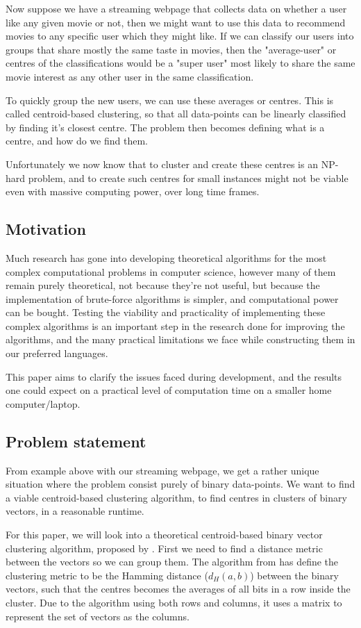 \documentclass[a4paper]{article}
\begin{document}
Now suppose we have a streaming webpage that collects data on whether a user like any given movie or not,
then we might want to use this data to recommend movies to any specific user which they might like.
If we can classify our users into groups that share mostly the same taste in movies, then
the "average-user" or centres of the classifications would be a "super user" most likely to share the same movie
interest as any other user in the same classification.

To quickly group the new users, we can use these averages or centres. This is called centroid-based
clustering, so that all data-points can be linearly classified by finding it's closest centre.
The problem then becomes defining what is a centre, and how do we find them.

Unfortunately we now know that to cluster and create these centres is an NP-hard problem, 
and to create such centres for small instances might not be viable even with massive computing power,
over long time frames.

\subsection{Motivation}
Much research has gone into developing theoretical algorithms for the most complex computational
problems in computer science, however many of them remain purely theoretical, not because
they're not useful, but because the implementation of brute-force algorithms is simpler, and
computational power can be bought. Testing the viability and practicality of implementing
these complex algorithms is an important step in the research done for improving the
algorithms, and the many practical limitations we face while constructing them in our
preferred languages.

This paper aims to clarify the issues faced during development, and the results one could expect
on a practical level of computation time on a smaller home computer/laptop.

\subsection{Problem statement}
From example above with our streaming webpage, we get a rather unique situation where the problem consist 
purely of binary data-points. We want to find a viable centroid-based clustering algorithm, to find
centres in clusters of binary vectors, in a reasonable runtime.

For this paper, we will look into a theoretical centroid-based binary vector clustering algorithm, proposed
by \cite{fomin_golovach_panolan_2020}. First we need to find a distance metric between the vectors so we 
can group them. The algorithm from \cite{fomin_golovach_panolan_2020} has define the clustering metric 
to be the Hamming distance (\textit{$d_H(a, b)$}) between the binary vectors, such that the centres 
becomes the averages of all bits in a row inside the cluster. Due to the algorithm using both rows and 
columns, it uses a matrix to represent the set of vectors as the columns.
\end{document}
